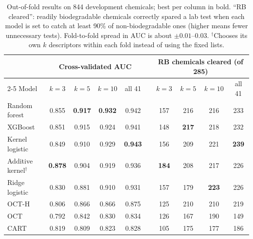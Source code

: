 \documentclass[11pt]{article}
\begin{document}
\begin{table}[t]
\centering
\small
\begin{tabular}{l cccc c cccc}
\toprule
 & \multicolumn{4}{c}{Cross-validated AUC} & & \multicolumn{4}{c}{RB chemicals cleared (of 285)} \\
\cmidrule{2-5} \cmidrule{7-10}
Model & $k=3$ & $k=5$ & $k=10$ & all 41 & & $k=3$ & $k=5$ & $k=10$ & all 41 \\
\midrule
Random forest        & 0.855 & \textbf{0.917} & \textbf{0.932} & 0.942 & & 157 & 216 & 216 & 233 \\
XGBoost              & 0.851 & 0.915 & 0.924 & 0.941 & & 148 & \textbf{217} & 218 & 232 \\
Kernel logistic      & 0.849 & 0.910 & 0.929 & \textbf{0.943} & & 156 & 209 & 221 & \textbf{239} \\
\midrule
Additive kernel$^\dagger$ & \textbf{0.878} & 0.904 & 0.919 & 0.936 & & \textbf{184} & 208 & 217 & 226 \\
Ridge logistic       & 0.830 & 0.881 & 0.910 & 0.931 & & 157 & 179 & \textbf{223} & 226 \\
OCT-H                & 0.806 & 0.866 & 0.866 & 0.875 & & 125 & 210 & 210 & 219 \\
OCT                  & 0.792 & 0.842 & 0.830 & 0.834 & & 126 & 167 & 190 & 149 \\
CART                 & 0.819 & 0.809 & 0.823 & 0.828 & & 105 & 175 & 177 & 186 \\
\bottomrule
\end{tabular}
\caption*{\footnotesize Out-of-fold results on 844 development chemicals; best per column in bold.
``RB cleared'': readily biodegradable chemicals correctly spared a lab test when each model is set
to catch at least 90\% of non-biodegradable ones (higher means fewer unnecessary tests).
Fold-to-fold spread in AUC is about $\pm 0.01$--$0.03$. $^\dagger$Chooses its own $k$ descriptors
within each fold instead of using the fixed lists.}
\end{table}
\end{document}
